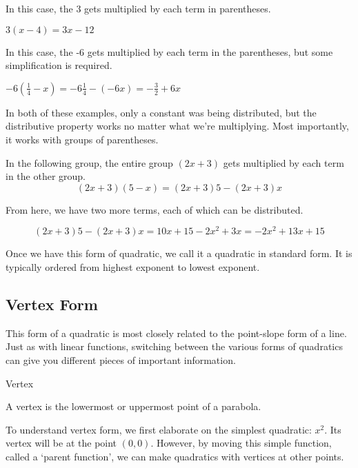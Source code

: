 \begin{example}

In this case, the 3 gets multiplied by each term in parentheses.

$3(x-4) = 3x - 12$

In this case, the -6 gets multiplied by each term in the parentheses, but some simplification is required.

$-6(\frac{1}{4}- x) = -6\frac{1}{4} -(-6x) = -\frac{3}{2} + 6x$

\end{example}

In both of these examples, only a constant was being distributed, but the distributive property works no matter what we're multiplying.  Most importantly, it works with groups of parentheses.

\begin{example}

In the following group, the entire group $(2x + 3)$ gets multiplied by each term in the other group.
$$(2x + 3)(5-x) = (2x+3)5 - (2x+3)x$$

From here, we have two more terms, each of which can be distributed.

$$(2x + 3)5 - (2x + 3)x = 10x+15-2x^2+3x = -2x^2 + 13x + 15$$
\end{example}

Once we have this form of quadratic, we call it a quadratic in standard form.  It is typically ordered from highest exponent to lowest exponent.

\subsection*{Vertex Form}

This form of a quadratic is most closely related to the point-slope form of a line.  Just as with linear functions, switching between the various forms of quadratics can give you different pieces of important information.

\begin{defn} Vertex

A vertex is the lowermost or uppermost point of a parabola.
\end{defn}

To understand vertex form, we first elaborate on the simplest quadratic: $x^2$.  Its vertex will be at the point $(0,0)$.  However, by moving this simple function, called a `parent function', we can make quadratics with vertices at other points.

